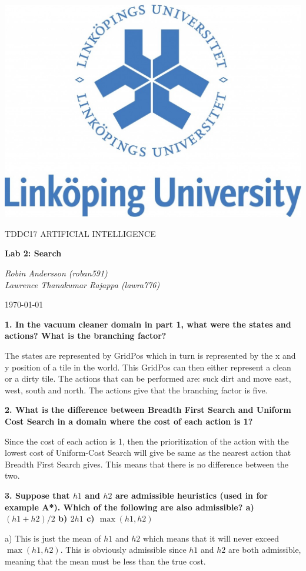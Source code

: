 \documentclass[a4paper,10pt]{article}
\begin{document}
\begin{titlepage}
	\centering
	\includegraphics[width=.6\textwidth]{liu-logo.png}\par
	\vfill
	{\scshape\Large TDDC17 ARTIFICIAL INTELLIGENCE\par}
	{\huge\bfseries Lab 2: Search\par}
	\vspace{1cm}
	{\large\itshape Robin Andersson (roban591) \\ Lawrence Thanakumar Rajappa (lawra776)\par}
	\vfill
	{\large \today\par}
\end{titlepage}

\textbf{1. In the vacuum cleaner domain in part 1, what were the states and actions? 
What is the branching factor?}

The states are represented by GridPos which in turn is represented by the x and y position of a tile in the world.
This GridPos can then either represent a clean or a dirty tile.
The actions that can be performed are: suck dirt and move east, west, south and north.
The actions give that the branching factor is five.

\textbf{2. What is the difference between Breadth First Search and Uniform Cost Search in a domain where the cost of each action is 1?}

Since the cost of each action is 1, then the prioritization of the action with the lowest cost of Uniform-Cost Search will
give be same as the nearest action that Breadth First Search gives.
This means that there is no difference between the two.

\textbf{3. Suppose that $h1$ and $h2$ are admissible heuristics (used in for example A*). Which of the following are also admissible? 
a) $(h1+h2)/2$
b) $2h1$
c) $\max(h1,h2)$}

a) This is just the mean of $h1$ and $h2$ which means that it will never exceed $\max(h1, h2)$.
This is obviously admissible since $h1$ and $h2$ are both admissible, meaning that the mean must be less than the true cost.
\end{document}
